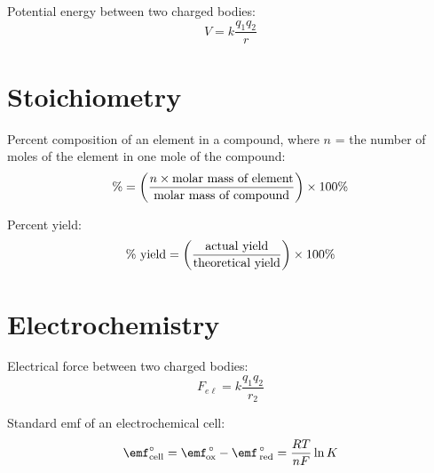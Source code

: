 \documentclass[10pt]{article}
\begin{document}
Potential energy between two charged bodies:
\begin{equation*}
V=k\frac{q_1q_2}{r}
\end{equation*}



\section{Stoichiometry}

Percent composition of an element in a compound, where $n$ = the number of moles of the element in one mole of the compound:
\begin{equation*}
\% = \left(\frac{n\times \textnormal{molar mass of element}}{\textnormal{molar mass of compound}}\right)\times 100\%
\end{equation*}

Percent yield:
\begin{equation*}
\textnormal{\% yield} = \left(\frac{\textnormal{actual yield}}{\textnormal{theoretical yield}}\right)\times 100\%
\end{equation*}


\newpage
\section{Electrochemistry}


Electrical force between two charged bodies:
\begin{equation*}
F_{e\ell}=k\frac{q_1q_2}{r_2}
\end{equation*}

Standard emf of an electrochemical cell:
\begin{equation*}
\textnormal{\Enotcell} = \textnormal{$\emf^{\hspace*{.5mm}\circ}_{\hspace*{-.3mm}\textnormal{ox}}$} - \textnormal{$\emf^{\hspace*{.5mm}\circ}_{\hspace*{.5mm}\textnormal{red}}$}  = \frac{RT}{nF} \ln K
\end{equation*}
\end{document}
